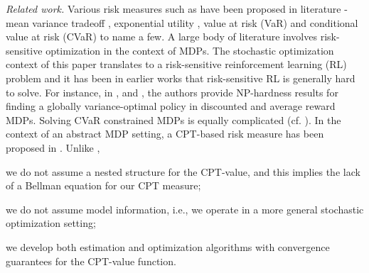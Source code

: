 %
%


\textit{Related work.}
Various risk measures such as have been proposed in literature - mean variance tradeoff \cite{markowitz1952portfolio}, exponential utility \cite{Arrow1971}, value at risk (VaR) and conditional value at risk (CVaR) \cite{rockafellar2000optimization} to name a few. A large body of literature involves risk-sensitive optimization in the context of MDPs.   
The stochastic optimization context of this paper translates to a risk-sensitive reinforcement learning (RL) problem and it has been in earlier works that risk-sensitive RL is generally hard to solve. 
For instance, in \cite{Sobel82VD}, \cite{filar1989variance} and \cite{mannor2013algorithmic}, the authors provide NP-hardness results for finding a globally variance-optimal policy in discounted and average reward MDPs.
Solving CVaR constrained MDPs is equally complicated (cf. \cite{borkar2010risk,prashanth2014policy,tamar2014optimizing}). 
In the context of an abstract MDP setting, a CPT-based risk measure has been proposed in \cite{lin2013stochastic}. Unlike \cite{lin2013stochastic},
\begin{inparaenum}[\it (i)]
\item we do not assume a nested structure for the CPT-value, %
and this implies the lack of a Bellman equation for our CPT measure;
\item we do not assume model information, i.e., we operate in a more general stochastic optimization setting;
\item we develop both estimation and optimization algorithms with convergence guarantees for the CPT-value function.
\end{inparaenum}

